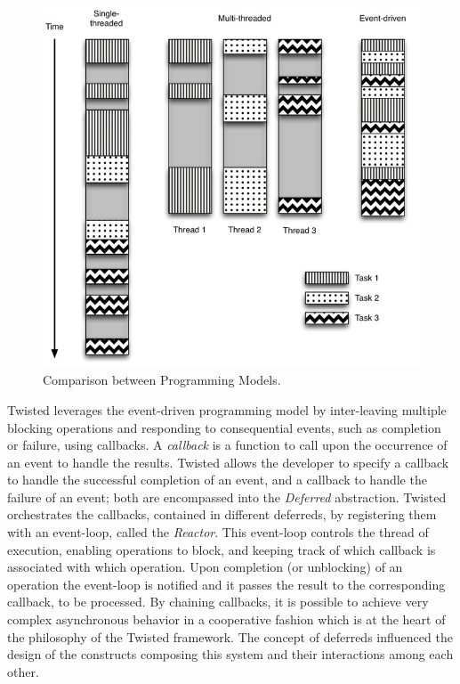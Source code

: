 \documentclass[12pt, titlepage]{uo_temp}
\begin{document}
     \begin{figure}[h]
       \includegraphics{images/twisted_multi.jpg}
       \caption{Comparison between Programming Models. \cite{mckellar2013twisted}}\label{multi}
     \end{figure}

     Twisted leverages the event-driven programming model by inter-leaving multiple
     blocking operations and responding to consequential events, such as completion or
     failure, using callbacks. A \emph{callback} is a function to call upon the occurrence
     of an event to handle the results. Twisted allows the developer to specify a callback
     to handle the successful completion of an event, and a callback to handle the failure
     of an event; both are encompassed into the \emph{Deferred} abstraction. Twisted
     orchestrates the callbacks, contained in different deferreds, by registering them
     with an event-loop, called the \emph{Reactor}. This event-loop controls the thread of
     execution, enabling operations to block, and keeping track of which callback is
     associated with which operation. Upon completion (or unblocking) of an operation the
     event-loop is notified and it passes the result to the corresponding callback, to
     be processed. By chaining callbacks, it is possible to achieve very complex asynchronous
     behavior in a cooperative fashion which is at the heart of the philosophy of the
     Twisted framework. 
     The concept of deferreds influenced the design of the constructs composing this
     system and their interactions among each other.\\
\end{document}
